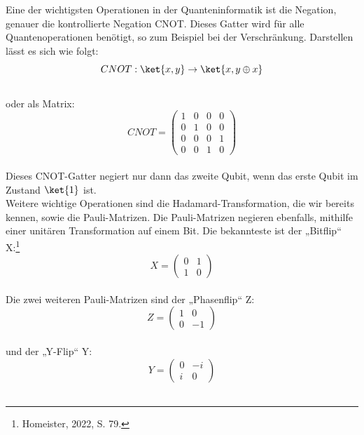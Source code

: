 Eine der wichtigsten Operationen in der Quanteninformatik ist die Negation, genauer die kontrollierte Negation CNOT\@.
Dieses Gatter wird für alle Quantenoperationen benötigt, so zum Beispiel bei der Verschränkung.
Darstellen lässt es sich wie folgt:\\
\begin{equation}
    CNOT : \ket{x,y} \rightarrow \ket{x,y\oplus x}
\end{equation}\\

oder als Matrix:\\
\begin{equation}
    CNOT =
    \begin{pmatrix}
        1 & 0 & 0 & 0 \\
        0 & 1 & 0 & 0 \\
        0 & 0 & 0 & 1 \\
        0 & 0 & 1 & 0
    \end{pmatrix}
\end{equation}\\

Dieses CNOT-Gatter negiert nur dann das zweite Qubit, wenn das erste Qubit im Zustand $\ket{1}$ ist.\\

Weitere wichtige Operationen sind die Hadamard-Transformation, die wir bereits kennen, sowie die Pauli-Matrizen.
Die Pauli-Matrizen negieren ebenfalls, mithilfe einer unitären Transformation auf einem Bit.
Die bekannteste ist der „Bitflip“ X:\footnote{Homeister, 2022, S. 79.}\\
\begin{equation}
    X =
    \begin{pmatrix}
        0 & 1 \\
        1 & 0
    \end{pmatrix}
\end{equation}\\

Die zwei weiteren Pauli-Matrizen sind der „Phasenflip“ Z:\\
\begin{equation}
    Z =
    \begin{pmatrix}
        1 & 0 \\
        0 & -1
    \end{pmatrix}
\end{equation}\\

und der „Y-Flip“ Y:\\
\begin{equation}
    Y =
    \begin{pmatrix}
        0 & -i \\
        i & 0
    \end{pmatrix}
\end{equation}\\

